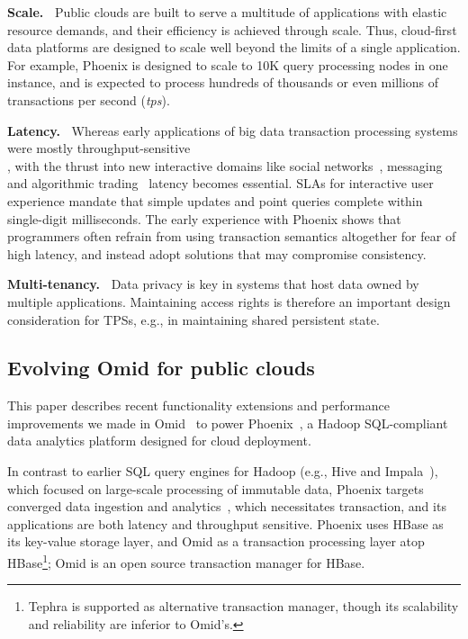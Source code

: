 {\bf Scale.\ } 
Public clouds  are built to  serve a multitude of applications 
with elastic resource demands, and their efficiency is achieved through  scale. 
Thus, cloud-first data platforms are  designed to scale well beyond the limits of a single application. 
For example, Phoenix is designed to scale to 10K query processing 
nodes in one instance, and is expected to   process hundreds
 of thousands or even millions of transactions per second ({\em tps}). 
 
{\bf Latency.\ }
Whereas early applications of big data transaction processing systems were 
mostly throughput-sensitive\\ \cite{Percolator2010, Omid2017}, 
with the thrust into new interactive domains like social networks~\cite{chatter},  
messaging~\cite{Borthakur:2011} and algorithmic trading~\cite{opentsdb} latency becomes essential.  
SLAs for interactive user experience mandate that simple updates and point queries  complete within 
single-digit milliseconds. The early experience with Phoenix shows that programmers  often
refrain from using transaction semantics altogether for fear of high latency, 
and instead  adopt solutions that may compromise consistency.

{\bf Multi-tenancy.\ } Data privacy is key in systems that host data owned by multiple applications.
Maintaining  access rights is therefore an important design consideration for TPSs, 
e.g., in maintaining shared persistent state. 

\subsection{Evolving Omid for public clouds}

This paper describes recent functionality extensions and performance improvements 
we made in Omid~\cite{omid} to power Phoenix~\cite{phoenix},  
a Hadoop SQL-compliant  data analytics platform designed 
for cloud deployment. 

In contrast to earlier SQL query engines for Hadoop (e.g., 
Hive\cite{hive} and Impala~\cite{impala}), which focused on large-scale processing
of immutable data, Phoenix targets converged data ingestion and analytics~\cite{PhoenixUseCases},
which necessitates transaction, and its  
applications are both latency and throughput sensitive. Phoenix uses HBase 
as its key-value storage layer, and Omid as a transaction processing layer atop HBase\footnote{\small{Tephra 
is supported as alternative transaction manager, though its scalability and reliability are inferior to Omid's.}}; 
Omid is an open source transaction manager for HBase. 

